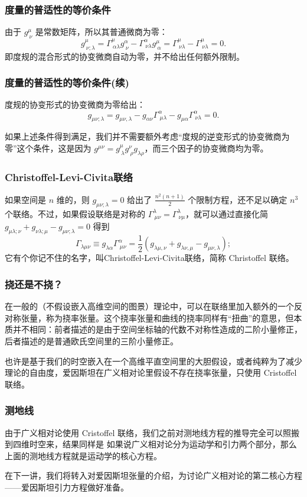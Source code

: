 \documentclass[CJK,13pt]{beamer}
\begin{document}
\begin{frame}
  \frametitle{度量的普适性的等价条件}
  由于 $g^\mu_{\ \nu}$ 是常数矩阵，所以其普通微商为零：
  $$g^\mu_{\ \nu;\lambda} = \Gamma^\mu_{\ \alpha\lambda}g^\alpha_{\ \nu} - \Gamma^\alpha_{\ \nu\lambda}g^\mu_{\ \alpha} = \Gamma^\mu_{\ \nu\lambda} - \Gamma^\mu_{\ \nu\lambda} = 0.$$
  即度规的混合形式的协变微商自动为零，并不给出任何额外限制。
\end{frame}


\begin{frame}
  \frametitle{度量的普适性的等价条件(续)}
  度规的协变形式的协变微商为零给出：
  $$g_{\mu\nu;\lambda} = g_{\mu\nu,\lambda}-g_{\alpha\nu}\Gamma^\alpha_{\ \mu\lambda}-g_{\mu\alpha}\Gamma^\alpha_{\ \nu\lambda}=0.$$
  
  如果上述条件得到满足，我们并不需要额外考虑“度规的逆变形式的协变微商为零”这个条件，这是因为 $g^{\mu\nu} = g^\mu_{\ \lambda}g^\nu_{\ \rho} g_{\lambda\rho}$，而三个因子的协变微商均为零。
\end{frame}

\begin{frame}
  \frametitle{Christoffel-Levi-Civita联络}
    如果空间是 $n$ 维的，则 $g_{\mu\nu;\lambda}= 0$ 给出了 $\frac{n^2(n+1)}{2}$ 个限制方程，还不足以确定 $n^3$ 个联络。不过，{\blue 如果假设联络是对称的 $\Gamma^\lambda_{\ \mu\nu}=\Gamma^\lambda_{\ \nu\mu}$}，就可以通过直接化简 $g_{\mu\lambda;\nu}+g_{\nu\lambda;\mu}-g_{\mu\nu;\lambda}=0$ 得到
  {\blue  $$\Gamma_{\lambda\mu\nu}\equiv g_{\lambda\alpha}\Gamma^\alpha_{\ \mu\nu}=\frac{1}{2}\left(g_{\lambda\mu,\nu}+g_{\lambda\nu,\mu}-g_{\mu\nu,\lambda}\right);$$}
  它有个你记不住的名字，叫{\blue Christoffel-Levi-Civita联络，简称 Christoffel 联络}。

\end{frame}


\begin{frame}
  \frametitle{挠还是不挠？}
  在一般的（不假设嵌入高维空间的图景）理论中，可以在联络里加入额外的一个反对称张量，称为{\blue 挠率张量}。这个挠率张量和曲线的挠率同样有“扭曲”的意思，但本质并不相同：前者描述的是由于空间坐标轴的代数不对称性造成的二阶小量修正，后者描述的是普通欧氏空间里的三阶小量修正。

  
  也许是基于我们的时空嵌入在一个高维平直空间里的大胆假设，或者纯粹为了减少理论的自由度，爱因斯坦在{\blue 广义相对论里假设不存在挠率张量，只使用 Cristoffel 联络}。
\end{frame}

\begin{frame}
  \frametitle{测地线}
  由于广义相对论使用 Cristoffel 联络，我们之前对测地线方程的推导完全可以照搬到四维时空来，结果同样是
  如果说广义相对论分为运动学和引力两个部分，那么上面的测地线方程就是运动学的核心方程。
\end{frame}


\begin{frame}
  在下一讲，我们将转入对爱因斯坦张量的介绍，为讨论广义相对论的第二核心方程——爱因斯坦引力方程做好准备。
\end{frame}

\ech
\end{document}
